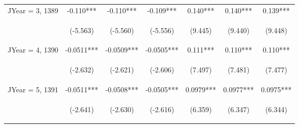 \documentclass[]{article}
\begin{document}
\begin{center}
\begin{tabular}{lcccccc}
JYear = 3, 1389 & -0.110*** & -0.110*** & -0.109*** & 0.140*** & 0.140*** & 0.139*** \\
\vspace{4pt} & \begin{footnotesize}(-5.563)\end{footnotesize} & \begin{footnotesize}(-5.560)\end{footnotesize} & \begin{footnotesize}(-5.556)\end{footnotesize} & \begin{footnotesize}(9.445)\end{footnotesize} & \begin{footnotesize}(9.440)\end{footnotesize} & \begin{footnotesize}(9.448)\end{footnotesize} \\
JYear = 4, 1390 & -0.0511*** & -0.0509*** & -0.0505*** & 0.111*** & 0.110*** & 0.110*** \\
\vspace{4pt} & \begin{footnotesize}(-2.632)\end{footnotesize} & \begin{footnotesize}(-2.621)\end{footnotesize} & \begin{footnotesize}(-2.606)\end{footnotesize} & \begin{footnotesize}(7.497)\end{footnotesize} & \begin{footnotesize}(7.481)\end{footnotesize} & \begin{footnotesize}(7.477)\end{footnotesize} \\
JYear = 5, 1391 & -0.0511*** & -0.0508*** & -0.0505*** & 0.0979*** & 0.0977*** & 0.0975*** \\
\vspace{4pt} & \begin{footnotesize}(-2.641)\end{footnotesize} & \begin{footnotesize}(-2.630)\end{footnotesize} & \begin{footnotesize}(-2.616)\end{footnotesize} & \begin{footnotesize}(6.359)\end{footnotesize} & \begin{footnotesize}(6.347)\end{footnotesize} & \begin{footnotesize}(6.344)\end{footnotesize} \\

\end{tabular}
\end{center}
\end{document}
